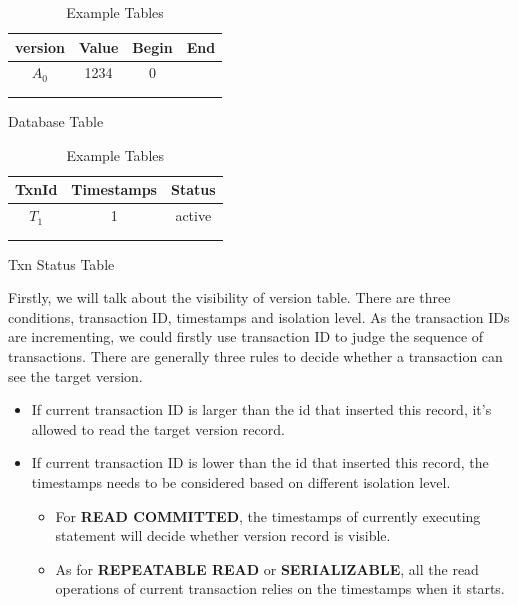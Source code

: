 \begin{table}
	\parbox{.45\linewidth}{
		\centering
		\begin{tabular}{|c|c|c|c|}
			\hline
			version&Value&Begin&End\\\hline
			$A_0$&1234&0& \\\hline
			&&&\\\hline
			&&&\\\hline
		\end{tabular}
		\caption*{Database Table}
	}
	\hfill
	\parbox{.45\linewidth}{
		\begin{tabular}{|c|c|c|}
			\hline
			TxnId&Timestamps&Status\\\hline
			$T_1$&1&active \\\hline
			&&\\\hline
			&&\\\hline
		\end{tabular}
		\caption*{Txn Status Table}
	}
\caption{Example Tables\label{table1}}
\end{table}

Firstly, we will talk about the visibility of version table. There are three conditions, transaction ID, timestamps and isolation level. As the transaction IDs  are incrementing, we could firstly use transaction ID to judge the sequence of transactions. There are generally three rules to decide whether a transaction can see the target version.	
\begin{itemize}
	\item If current transaction ID is larger than the id that inserted this record, it's allowed to read the target version record.
	\item If current transaction ID is lower than the id that inserted this record, the timestamps needs to be considered based on different isolation level.
	\begin{itemize}
		\item For \textbf{READ COMMITTED}, the timestamps of currently executing statement will decide whether version record is visible.
		\item As for \textbf{REPEATABLE READ} or \textbf{SERIALIZABLE}, all the read operations of current transaction relies on the timestamps when it starts.
	\end{itemize}
\end{itemize}

